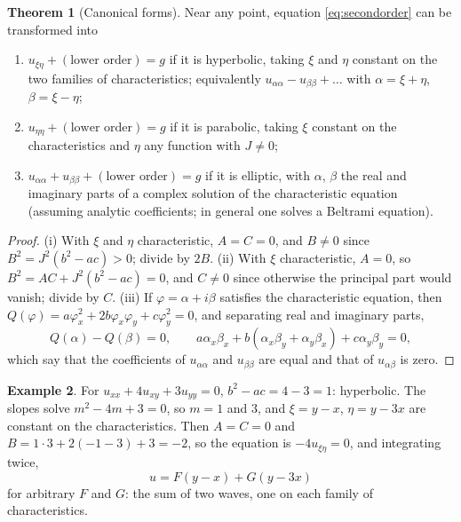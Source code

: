 \documentclass[11pt,a4paper]{article}
\numberwithin{equation}{section}
\theoremstyle{definition}
\newtheorem{thm}{Theorem}[subsection]
\newtheorem{exa}[thm]{Example}
\begin{document}
\begin{thm}[Canonical forms]
\label{thm:canonical}
Near any point, equation \eqref{eq:secondorder} can be transformed into
\begin{enumerate}[label=(\roman*)]
\item $u_{\xi\eta} + (\text{lower order}) = g$ if it is hyperbolic, taking $\xi$ and $\eta$ constant on the two families of characteristics; equivalently $u_{\alpha\alpha} - u_{\beta\beta} + \ldots$ with $\alpha = \xi + \eta$, $\beta = \xi - \eta$;
\item $u_{\eta\eta} + (\text{lower order}) = g$ if it is parabolic, taking $\xi$ constant on the characteristics and $\eta$ any function with $J \neq 0$;
\item $u_{\alpha\alpha} + u_{\beta\beta} + (\text{lower order}) = g$ if it is elliptic, with $\alpha$, $\beta$ the real and imaginary parts of a complex solution of the characteristic equation (assuming analytic coefficients; in general one solves a Beltrami equation).
\end{enumerate}
\end{thm}

\begin{proof}
(i) With $\xi$ and $\eta$ characteristic, $A = C = 0$, and $B \neq 0$ since $B^2 = J^2(b^2 - ac) > 0$; divide by $2B$. (ii) With $\xi$ characteristic, $A = 0$, so $B^2 = AC + J^2(b^2 - ac) = 0$, and $C \neq 0$ since otherwise the principal part would vanish; divide by $C$.
(iii) If $\varphi = \alpha + i\beta$ satisfies the characteristic equation, then $Q(\varphi) = a\varphi_x^2 + 2b\varphi_x\varphi_y + c\varphi_y^2 = 0$, and separating real and imaginary parts,
\[
Q(\alpha) - Q(\beta) = 0, \qquad a\alpha_x\beta_x + b(\alpha_x\beta_y + \alpha_y\beta_x) + c\alpha_y\beta_y = 0 ,
\]
which say that the coefficients of $u_{\alpha\alpha}$ and $u_{\beta\beta}$ are equal and that of $u_{\alpha\beta}$ is zero.
\end{proof}

\begin{exa}
\label{ex:canonical}
For $u_{xx} + 4u_{xy} + 3u_{yy} = 0$, $b^2 - ac = 4 - 3 = 1$: hyperbolic. The slopes solve $m^2 - 4m + 3 = 0$, so $m = 1$ and $3$, and $\xi = y - x$, $\eta = y - 3x$ are constant on the characteristics. Then $A = C = 0$ and
$B = 1\cdot 3 + 2(-1 - 3) + 3 = -2$, so the equation is $-4u_{\xi\eta} = 0$, and integrating twice,
\[
u = F(y - x) + G(y - 3x)
\]
for arbitrary $F$ and $G$: the sum of two waves, one on each family of characteristics.
\end{exa}
\end{document}
